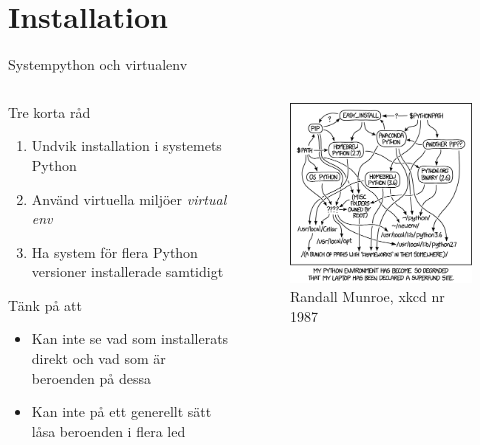 \section{Installation}

\begin{frame}{Systempython och virtualenv}
  \begin{columns}
    \begin{column}{0.7\linewidth}
      Tre korta råd
      \begin{enumerate}
        \item Undvik installation i systemets Python
        \item Använd virtuella miljöer \textit{virtual env}
        \item Ha system för flera Python versioner installerade samtidigt
      \end{enumerate}

      Tänk på att
      \begin{itemize}
        \item Kan inte se vad som installerats direkt och vad som är beroenden på dessa
        \item Kan inte på ett generellt sätt låsa beroenden i flera led
      \end{itemize}
    \end{column}
    \begin{column}{0.3\linewidth}
      \begin{figure}
        \includegraphics[width=\linewidth,keepaspectratio]{fig/python_environment}
        \caption{Randall Munroe, xkcd nr 1987}
      \end{figure}
    \end{column}
  \end{columns}
\end{frame}

